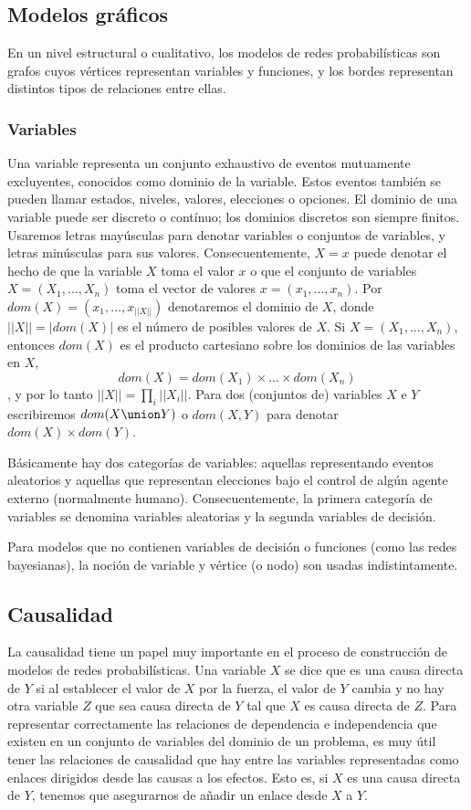 \subsection{Modelos gráficos}
En un nivel estructural o cualitativo, los modelos de redes probabilísticas son grafos cuyos vértices 
representan variables y funciones, y los bordes representan distintos tipos de relaciones entre ellas. 

\subsubsection{Variables}
Una variable representa un conjunto exhaustivo de eventos mutuamente excluyentes, conocidos como dominio de la variable. Estos 
eventos también se pueden llamar estados, niveles, valores, elecciones o opciones. El dominio de una variable puede ser discreto o 
contínuo; los dominios discretos son siempre finitos. Usaremos letras mayúsculas para denotar variables o conjuntos de variables, 
y letras minúsculas para sus valores. Consecuentemente, $X = x$ puede denotar el hecho de que la variable $X$ toma el valor $x$ o que 
el conjunto de variables $X = (X_{1},...,X_{n})$ toma el vector de valores $x = (x_{1},...,x_{n})$. Por $dom(X)= (x_{1},...,x_{||X||})$ 
denotaremos el dominio de $X$, donde $||X|| = |dom(X)|$ es el número de posibles valores de $X$. Si $X = (X_{1},...,X_{n})$, entonces $dom(X)$ 
es el producto cartesiano sobre los dominios de las variables en $X$, $$dom(X)=dom(X_{1})\times ... \times dom(X_{n})$$, y por lo tanto $||X|| = \prod_i ||X_{i}||$. 
Para dos (conjuntos de) variables $X$ e $Y$ escribiremos $dom(X \union Y)$ o $dom(X,Y)$ para denotar $dom(X) \times dom(Y)$.

Básicamente hay dos categorías de variables: aquellas representando eventos aleatorios y aquellas que representan elecciones bajo el 
control de algún agente externo (normalmente humano). Consecuentemente, la primera categoría de variables se denomina variables aleatorias y la segunda 
variables de decisión.

Para modelos que no contienen variables de decisión o funciones (como las redes bayesianas), la noción de variable y vértice (o nodo) son usadas 
indistintamente.  

\subsection{Causalidad}
La causalidad tiene un papel muy importante en el proceso de construcción de modelos de redes probabilísticas. Una variable $X$ se dice que es 
una causa directa de $Y$ si al establecer el valor de $X$ por la fuerza, el valor de $Y$ cambia y no hay otra variable $Z$ que sea causa directa de 
$Y$ tal que $X$ es causa directa de $Z$. Para representar correctamente las relaciones de dependencia e independencia que existen en un conjunto de variables 
del dominio de un problema, es muy útil tener las relaciones de causalidad que hay entre las variables representadas como enlaces dirigidos desde las causas 
a los efectos. Esto es, si $X$ es una causa directa de $Y$, tenemos que asegurarnos de añadir un enlace desde $X$ a $Y$. 


